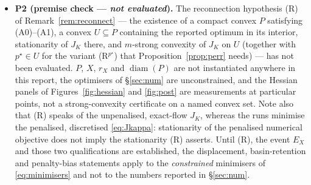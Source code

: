 \documentclass[11pt]{article}
\theoremstyle{remark}\newtheorem{remark}{Remark}
\newcommand{\pstar}{p^\star}
\begin{document}
\begin{itemize}[nosep]
\item \textbf{P2 (premise check --- \emph{not evaluated}).} The reconnection hypothesis (R) of Remark~\ref{rem:reconnect} --- the existence of a compact convex $P$ satisfying (A0)--(A1), a convex $U\subseteq P$ containing the reported optimum in its interior, stationarity of $J_K$ there, and $m$-strong convexity of $J_K$ on $U$ (together with $\pstar\in U$ for the variant (R$^{\pstar}$) that Proposition~\ref{prop:perr} needs) --- has not been evaluated. $P$, $X$, $r_X$ and $\operatorname{diam}(P)$ are not instantiated anywhere in this report, the optimisers of \S\ref{sec:num} are unconstrained, and the Hessian panels of Figures~\ref{fig:hessian} and \ref{fig:post} are measurements at particular points, not a strong-convexity certificate on a named convex set. Note also that (R) speaks of the unpenalised, exact-flow $J_K$, whereas the runs minimise the penalised, discretised \eqref{eq:Jkappa}: stationarity of the penalised numerical objective does not imply the stationarity (R) asserts. Until (R), the event $E_X$ and those two qualifications are established, the displacement, basin-retention and penalty-bias statements apply to the \emph{constrained} minimisers of \eqref{eq:minimisers} and not to the numbers reported in \S\ref{sec:num}.
\end{itemize}
\end{document}
